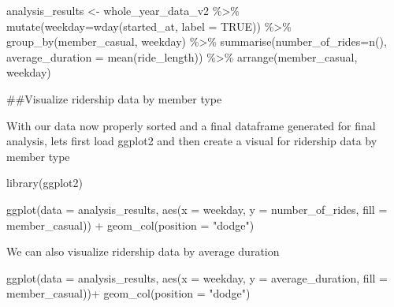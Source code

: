 \documentclass[
]{article}
\newenvironment{Shaded}{\begin{snugshade}}{\end{snugshade}}
\newcommand{\AttributeTok}[1]{\textcolor[rgb]{0.77,0.63,0.00}{#1}}
\newcommand{\ConstantTok}[1]{\textcolor[rgb]{0.00,0.00,0.00}{#1}}
\newcommand{\FunctionTok}[1]{\textcolor[rgb]{0.00,0.00,0.00}{#1}}
\newcommand{\NormalTok}[1]{#1}
\newcommand{\OtherTok}[1]{\textcolor[rgb]{0.56,0.35,0.01}{#1}}
\newcommand{\SpecialCharTok}[1]{\textcolor[rgb]{0.00,0.00,0.00}{#1}}
\newcommand{\StringTok}[1]{\textcolor[rgb]{0.31,0.60,0.02}{#1}}
\begin{document}
\begin{Shaded}
\begin{Highlighting}[]
\NormalTok{analysis\_results }\OtherTok{\textless{}{-}}\NormalTok{ whole\_year\_data\_v2 }\SpecialCharTok{\%\textgreater{}\%} 
  \FunctionTok{mutate}\NormalTok{(}\AttributeTok{weekday=}\FunctionTok{wday}\NormalTok{(started\_at, }\AttributeTok{label =} \ConstantTok{TRUE}\NormalTok{)) }\SpecialCharTok{\%\textgreater{}\%} 
  \FunctionTok{group\_by}\NormalTok{(member\_casual, weekday) }\SpecialCharTok{\%\textgreater{}\%} 
  \FunctionTok{summarise}\NormalTok{(}\AttributeTok{number\_of\_rides=}\FunctionTok{n}\NormalTok{(), }\AttributeTok{average\_duration =} \FunctionTok{mean}\NormalTok{(ride\_length)) }\SpecialCharTok{\%\textgreater{}\%} 
  \FunctionTok{arrange}\NormalTok{(member\_casual, weekday)}
\end{Highlighting}
\end{Shaded}

\#\#Visualize ridership data by member type

With our data now properly sorted and a final dataframe generated for
final analysis, lets first load ggplot2 and then create a visual for
ridership data by member type

\begin{Shaded}
\begin{Highlighting}[]
\FunctionTok{library}\NormalTok{(ggplot2)}

\FunctionTok{ggplot}\NormalTok{(}\AttributeTok{data =}\NormalTok{ analysis\_results, }\FunctionTok{aes}\NormalTok{(}\AttributeTok{x =}\NormalTok{ weekday, }\AttributeTok{y =}\NormalTok{ number\_of\_rides, }\AttributeTok{fill =}\NormalTok{ member\_casual)) }\SpecialCharTok{+}
  \FunctionTok{geom\_col}\NormalTok{(}\AttributeTok{position =} \StringTok{"dodge"}\NormalTok{)}
\end{Highlighting}
\end{Shaded}

We can also visualize ridership data by average duration

\begin{Shaded}
\begin{Highlighting}[]
\FunctionTok{ggplot}\NormalTok{(}\AttributeTok{data =}\NormalTok{ analysis\_results, }\FunctionTok{aes}\NormalTok{(}\AttributeTok{x =}\NormalTok{ weekday, }\AttributeTok{y =}\NormalTok{ average\_duration, }\AttributeTok{fill =}\NormalTok{ member\_casual))}\SpecialCharTok{+}
  \FunctionTok{geom\_col}\NormalTok{(}\AttributeTok{position =} \StringTok{"dodge"}\NormalTok{)}
\end{Highlighting}
\end{Shaded}
\end{document}

